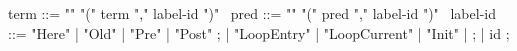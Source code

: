 \begin{syntax}
  term ::= "\at" "(" term "," label-id ")"
  \ 
  pred ::= "\at" "(" pred "," label-id ")" 
  \
  label-id ::= "Here" | "Old" | "Pre" | "Post" ;
             | "LoopEntry" | "LoopCurrent" | "Init" | ;
             | id ;
\end{syntax}

